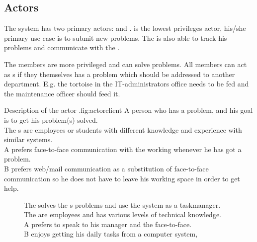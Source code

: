 \subsection{Actors}
\label{sec:actors}

The system has two primary actors:  \aclient{} and \astaff. \aclient[c] is the lowest privileges actor, his/she primary use case is to submit new problems. The \aclient[] is also able to track his problems and communicate with the \astaff[]. 

The \astaff{} members are more privileged and can solve problems. 
All \astaff{} members can act as \aclient{}s if they themselves has a problem which should be addressed to another department. 
E.g. the tortoise in the IT-administrators office needs to be fed and the maintenance officer should feed it. 


\begin{sadlist}[h]{\Aclient}{Description of the actor \aclient.}{fig:actorclient}
 A person who has a problem, and his goal is to get his problem(s) solved. \\
 The \aclient{}s are employees or students with different knowledge and experience with similar systems. \\%
 \Aclient{} A prefers face-to-face communication with the working \astaff{} whenever he has got a problem.\\
\aclient[c] B prefers web/mail communication as a substitution of face-to-face communication so he does not have to leave his working space in order to get help. 
\end{sadlist} 

\begin{figure}[H]
\begin{sadlistar}{\Astaff}
 The \astaff{} solves the \aclient[]s problems and use the system as a taskmanager.  \\
 The \astaff[] are employees and has various levels of technical knowledge. \\
 \astaff[c] A prefers to speak to his manager and the \aclient[] face-to-face.\\
\astaff[c] B enjoys getting his daily tasks from a computer system, 
 \end{sadlistar}
 \caption{}
 \label{fig:actorstaff}
 \end{figure}


